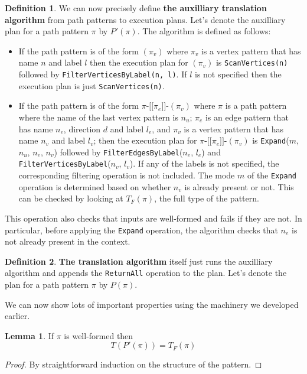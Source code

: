 \documentclass[14pt]{constructor-thesis}
\theoremstyle{definition}
\newtheorem{lemma}{Lemma}
\newtheorem{definition}{Definition}
\newcommand{\patternstart}[1]{(#1)}
\newcommand{\patternhop}[3]{#1 \texttt{-[[} #2 \texttt{]]-} (#3)}
\begin{document}
\begin{definition}
  We can now precisely define \textbf{the auxilliary translation algorithm} from path patterns to execution plans. Let's denote the auxilliary plan for a path pattern $\pi$ by $P'(\pi)$. The algorithm is defined as follows:
  \begin{itemize}
    \item If the path pattern is of the form $\patternstart{\pi_v}$ where $\pi_v$ is a vertex pattern that has name $n$ and label $l$ then the execution plan for $(\pi_v)$ is \texttt{ScanVertices(n)} followed by \texttt{FilterVerticesByLabel(n, l)}. If $l$ is not specified then the execution plan is just \texttt{ScanVertices(n)}.

    \item If the path pattern is of the form $\patternhop{\pi}{\pi_e}{\pi_v}$ where $\pi$ is a path pattern where the name of the last vertex pattern is $n_u$; $\pi_e$ is an edge pattern that has name $n_e$, direction $d$ and label $l_e$, and $\pi_v$ is a vertex pattern that has name $n_v$ and label $l_v$; then the execution plan for $\patternhop{\pi}{\pi_e}{\pi_v}$ is \texttt{Expand}($m$, $n_u$, $n_e$, $n_v$) followed by \texttt{FilterEdgesByLabel}($n_e$, $l_e$) and \texttt{FilterVerticesByLabel}($n_v$, $l_v$). 
    If any of the labels is not specified, the corresponding filtering operation is not included. The mode $m$ of the \texttt{Expand} operation is determined based on whether $n_v$ is already present or not. This can be checked by looking at $T_F(\pi)$, the full type of the pattern.
  \end{itemize} 

  This operation also checks that inputs are well-formed and fails if they are not. In particular, before applying the \texttt{Expand} operation, the algorithm checks that $n_e$ is not already present in the context.
\end{definition}

\begin{definition}
  \textbf{The translation algorithm} itself just runs the auxilliary algorithm and appends the \texttt{ReturnAll} operation to the plan.
  Let's denote the plan for a path pattern $\pi$ by $P(\pi)$.
\end{definition}

We can now show lots of important properties using the machinery we developed earlier.

\begin{lemma}
  \label{lem:neo4j-translation-type}
  If $\pi$ is well-formed then
  $$T(P'(\pi)) = T_F(\pi)$$
\end{lemma}
\begin{proof}
  By straightforward induction on the structure of the pattern.
\end{proof}
\end{document}
